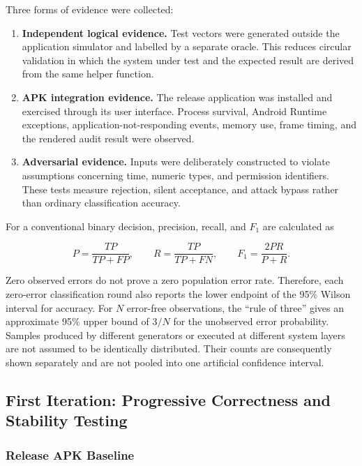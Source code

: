 Three forms of evidence were collected:

\begin{enumerate}
    \item \textbf{Independent logical evidence.} Test vectors were generated outside the application simulator and labelled by a separate oracle. This reduces circular validation in which the system under test and the expected result are derived from the same helper function.
    \item \textbf{APK integration evidence.} The release application was installed and exercised through its user interface. Process survival, Android Runtime exceptions, application-not-responding events, memory use, frame timing, and the rendered audit result were observed.
    \item \textbf{Adversarial evidence.} Inputs were deliberately constructed to violate assumptions concerning time, numeric types, and permission identifiers. These tests measure rejection, silent acceptance, and attack bypass rather than ordinary classification accuracy.
\end{enumerate}

For a conventional binary decision, precision, recall, and $F_1$ are calculated as

\begin{equation}
P=\frac{TP}{TP+FP}, \qquad
R=\frac{TP}{TP+FN}, \qquad
F_1=\frac{2PR}{P+R}.
\end{equation}

Zero observed errors do not prove a zero population error rate. Therefore, each zero-error classification round also reports the lower endpoint of the 95\% Wilson interval for accuracy. For $N$ error-free observations, the ``rule of three'' gives an approximate 95\% upper bound of $3/N$ for the unobserved error probability. Samples produced by different generators or executed at different system layers are not assumed to be identically distributed. Their counts are consequently shown separately and are not pooled into one artificial confidence interval.

\subsection{First Iteration: Progressive Correctness and Stability Testing}

\subsubsection{Release APK Baseline}

